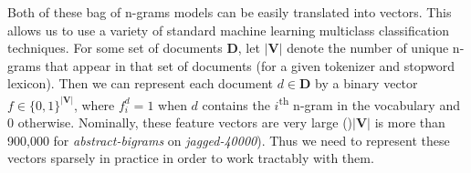 Both of these bag of n-grams models can be easily translated into vectors. This allows us to use a variety of standard machine learning multiclass classification techniques. For some set of documents $\mathbf{D}$, let $| \mathbf{V} |$ denote the number of unique n-grams that appear in that set of documents (for a given tokenizer and stopword lexicon). Then we can represent each document $ d \in \mathbf{D}$ by a binary vector $f \in \{0,1\}^{| \mathbf{V} |}$, where $f^d_i = 1$ when $d$ contains the $i$\textsuperscript{th} n-gram in the vocabulary and 0 otherwise. Nominally, these feature vectors are very large ()$| \mathbf{V} |$ is more than 900,000 for \emph{abstract-bigrams} on \emph{jagged-40000}). Thus we need to represent these vectors sparsely in practice in order to work tractably with them.


